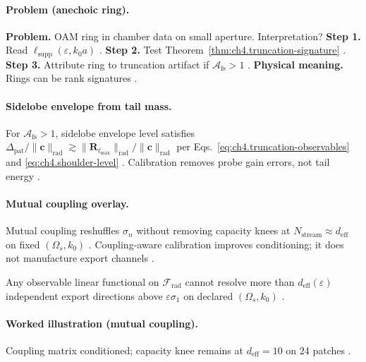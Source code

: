 \paragraph{Problem (anechoic ring).}
\textbf{Problem.} OAM ring in chamber data on small aperture. Interpretation?
\textbf{Step 1.} Read \(\ell_{\mathrm{supp}}(\varepsilon,k_{0}a)\) \cite{hansen1988,harrington2001}.
\textbf{Step 2.} Test Theorem~\ref{thm:ch4.truncation-signature} \cite{stratton1941,devaney2004}.
\textbf{Step 3.} Attribute ring to truncation artifact if \(\mathcal{A}_{\mathrm{fs}}>1\) \cite{jackson1999}.
\textbf{Physical meaning.} Rings can be rank signatures \cite{harrington2001}.

\paragraph{Sidelobe envelope from tail mass.}
For \(\mathcal{A}_{\mathrm{fs}}>1\), sidelobe envelope level satisfies
\(\Delta_{\mathrm{pat}}/\|\mathbf{c}\|_{\mathrm{rad}}\gtrsim\|\mathbf{R}_{\ell_{\max}}\|_{\mathrm{rad}}/\|\mathbf{c}\|_{\mathrm{rad}}\) per
Eqs.~\eqref{eq:ch4.truncation-observables} and \eqref{eq:ch4.shoulder-level} \cite{hansen1988,stratton1941,harrington2001,devaney2004,jackson1999}.
Calibration removes probe gain errors, not tail energy \cite{harrington2001,collin2001}.

\paragraph{Mutual coupling overlay.}
Mutual coupling reshuffles \(\sigma_{n}\) without removing capacity knees at \(N_{\mathrm{stream}}\approx d_{\mathrm{eff}}\) on fixed \((\Omega_{s},k_{0})\)
\cite{harrington2001,devaney2004,hansen1988,stratton1941}. Coupling-aware calibration improves conditioning; it does not manufacture export channels
\cite{jackson1999,collin2001}.

\begin{corollary}
\label{cor:ch4.observable-rank-sat}
Any observable linear functional on \(\mathcal{F}_{\mathrm{rad}}\) cannot resolve more than \(d_{\mathrm{eff}}(\varepsilon)\) independent export directions
above \(\varepsilon\sigma_{1}\) on declared \((\Omega_{s},k_{0})\) \cite{stratton1941,harrington2001,hansen1988,devaney2004,jackson1999}.
\end{corollary}

\paragraph{Worked illustration (mutual coupling).}
Coupling matrix conditioned; capacity knee remains at \(d_{\mathrm{eff}}=10\) on \(24\) patches \cite{harrington2001,devaney2004,hansen1988,collin2001}.

